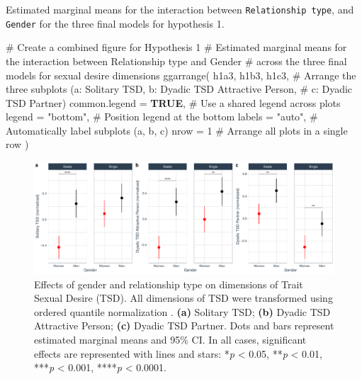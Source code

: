 \documentclass[
  bookmarksnumbered]{article}
\newenvironment{Shaded}{\begin{snugshade}}{\end{snugshade}}
\newcommand{\AttributeTok}[1]{\textcolor[rgb]{0.80,0.80,0.80}{#1}}
\newcommand{\CommentTok}[1]{\textcolor[rgb]{0.50,0.62,0.50}{#1}}
\newcommand{\ConstantTok}[1]{\textcolor[rgb]{0.86,0.64,0.64}{\textbf{#1}}}
\newcommand{\DecValTok}[1]{\textcolor[rgb]{0.86,0.86,0.80}{#1}}
\newcommand{\FunctionTok}[1]{\textcolor[rgb]{0.94,0.94,0.56}{#1}}
\newcommand{\NormalTok}[1]{\textcolor[rgb]{0.80,0.80,0.80}{#1}}
\newcommand{\StringTok}[1]{\textcolor[rgb]{0.80,0.58,0.58}{#1}}
\begin{document}
Estimated marginal means for the interaction between \texttt{Relationship\ type}, and \texttt{Gender} for the three final models for hypothesis 1.

\begin{Shaded}
\begin{Highlighting}[]
\CommentTok{\# Create a combined figure for Hypothesis 1}
\CommentTok{\# Estimated marginal means for the interaction between Relationship type and Gender}
\CommentTok{\# across the three final models for sexual desire dimensions}
\FunctionTok{ggarrange}\NormalTok{(}
\NormalTok{  h1a3, h1b3, h1c3, }\CommentTok{\# Arrange the three subplots (a: Solitary TSD, b: Dyadic TSD Attractive Person,}
  \CommentTok{\# c: Dyadic TSD Partner)}
  \AttributeTok{common.legend =} \ConstantTok{TRUE}\NormalTok{, }\CommentTok{\# Use a shared legend across plots}
  \AttributeTok{legend =} \StringTok{"bottom"}\NormalTok{, }\CommentTok{\# Position legend at the bottom}
  \AttributeTok{labels =} \StringTok{"auto"}\NormalTok{, }\CommentTok{\# Automatically label subplots (a, b, c)}
  \AttributeTok{nrow =} \DecValTok{1} \CommentTok{\# Arrange all plots in a single row}
\NormalTok{)}
\end{Highlighting}
\end{Shaded}

\begin{figure}
\centering
\includegraphics{Sexual_Desire_Arousal_files/figure-latex/fig-m1-fin-1.pdf}
\caption{\label{fig:fig-m1-fin}Effects of gender and relationship type on dimensions of Trait Sexual Desire (TSD). All dimensions of TSD were transformed using ordered quantile normalization \autocite{petersonOrderedQuantileNormalization2020a}. \textbf{(a)} Solitary TSD; \textbf{(b)} Dyadic TSD Attractive Person; \textbf{(c)} Dyadic TSD Partner. Dots and bars represent estimated marginal means and 95\% CI. In all cases, significant effects are represented with lines and stars: *\emph{p} \textless{} 0.05, **\emph{p} \textless{} 0.01, ***\emph{p} \textless{} 0.001, ****\emph{p} \textless{} 0.0001.}
\end{figure}
\end{document}
